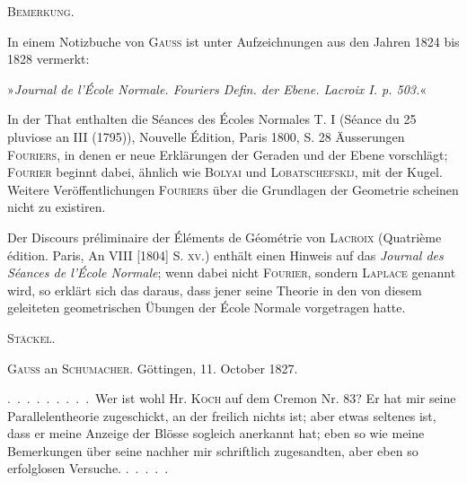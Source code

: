 \begin{center}
\textsc{Bemerkung.}
\end{center}

In einem Notizbuche von \textsc{Gauss} ist unter Aufzeichnungen aus den
Jahren 1824 bis 1828 vermerkt:
\begin{center}»\emph{Journal de l'École Normale. Fouriers
Defin. der Ebene. Lacroix I. p. 503.}«\end{center}

In der That enthalten die Séances des Écoles Normales T. I (Séance du 25
pluviose an III (1795)), Nouvelle Édition, Paris 1800, S. 28 Äusserungen
\textsc{Fouriers}, in denen er neue Erklärungen der Geraden und der Ebene
vorschlägt; \textsc{Fourier} beginnt dabei, ähnlich wie \textsc{Bolyai} und
\textsc{Lobatschefskij}, mit der Kugel. Weitere Veröffentlichungen
\textsc{Fouriers} über die Grundlagen der Geometrie scheinen nicht zu
existiren.

Der Discours préliminaire der Éléments de Géométrie von \textsc{Lacroix}
(Quatrième édition. Paris, An VIII [1804] S. \textsc{xv}.) enthält einen Hinweis auf
das \emph{Journal des Séances de l'École Normale}; wenn dabei nicht
\textsc{Fourier}, sondern \textsc{Laplace} genannt wird, so erklärt sich das
daraus, dass jener seine Theorie in den von diesem geleiteten geometrischen
Übungen der École Normale vorgetragen hatte.

\begin{flushright}
\textsc{Stäckel.}
\end{flushright}

\medskip

\begin{center}
\textsc{Gauss} an \textsc{Schumacher}. Göttingen, 11. October 1827.
\end{center}

.\ .\ .\ .\ .\ .\ .\ .\ .\ Wer ist wohl Hr. \textsc{Koch} auf dem Cremon Nr. 83? Er hat
mir seine Parallelentheorie zugeschickt, an der freilich nichts ist; aber
etwas seltenes ist, dass er meine Anzeige der Blösse sogleich anerkannt hat;
eben so wie meine Bemerkungen über seine nachher mir schriftlich
zugesandten, aber eben so erfolglosen Versuche. .\ .\ .\ .\ .

